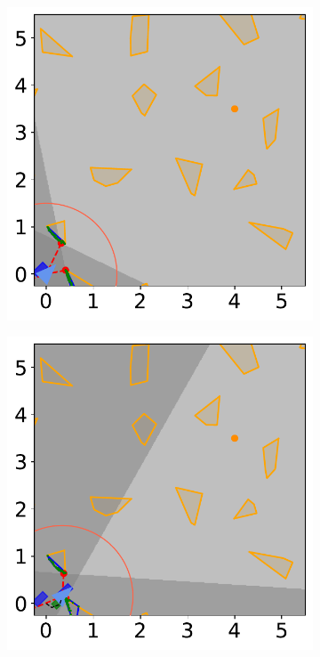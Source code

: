 \newpage
\begin{figure}[H]
    \centering
    \begin{subfigure}{0.30\textwidth}
        \centering
        \includegraphics[width=\textwidth]{figures/Simulations/sim2unkenv/frame_0.pdf}
    \end{subfigure}%
    \hspace{1em}
    \begin{subfigure}{0.30\textwidth}
        \centering
        \includegraphics[width=\textwidth]{figures/Simulations/sim2unkenv/frame_1.pdf}
    \end{subfigure}%


\end{figure}
